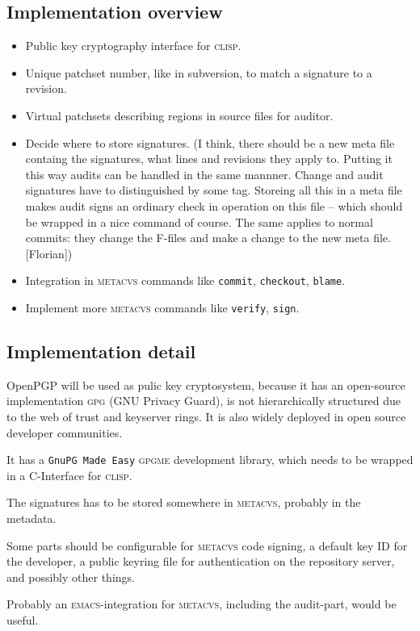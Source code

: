 \documentclass[fleqn, 10pt, a4paper]{article}
\begin{document}
\subsection{Implementation overview}
\begin{itemize}
\item Public key cryptography interface for \textsc{clisp}.
\item Unique patchset number, like in subversion, to match a signature to a revision.
\item Virtual patchsets describing regions in source files for auditor.
\item Decide where to store signatures.
(I think, there should be a new meta file containg the signatures, what
lines and revisions they apply to. Putting it this way audits can be handled
in the same mannner. Change and audit signatures have to distinguished by
some tag. Storeing all this in a meta file makes audit signs an
ordinary check in operation on this file -- which should be wrapped in
a nice command of course. The same applies to normal commits: they
change the F-files and make a change to the new meta file. [Florian])
\item Integration in \textsc{metacvs} commands like \texttt{commit},
\texttt{checkout}, \texttt{blame}.
\item Implement more \textsc{metacvs} commands like \texttt{verify},
\texttt{sign}.
\end{itemize}

\subsection{Implementation detail}
OpenPGP will be used as pulic key cryptosystem, because it has an
open-source implementation \textsc{gpg} (GNU Privacy Guard), is not
hierarchically structured due to the web of trust and keyserver rings.
It is also widely deployed in open source developer communities.

It has a \texttt{GnuPG Made Easy} \textsc{gpgme} development library,
which needs to be wrapped in a C-Interface for \textsc{clisp}.

The signatures has to be stored somewhere in \textsc{metacvs}, probably
in the metadata.

Some parts should be configurable for \textsc{metacvs} code signing,
a default key ID for the developer, a public keyring file for authentication
on the repository server, and possibly other things.

Probably an \textsc{emacs}-integration for \textsc{metacvs}, including the
audit-part, would be useful.
\end{document}
